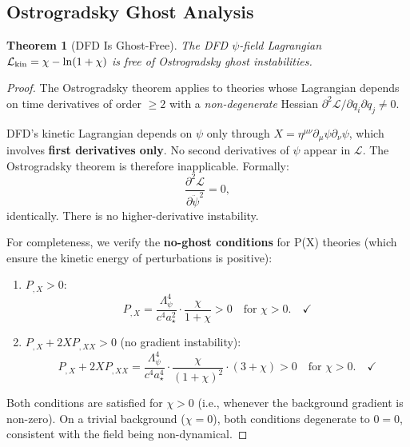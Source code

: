 \documentclass[11pt,a4paper]{article}
\newtheorem{theorem}{Theorem}
\begin{document}
\subsection{Ostrogradsky Ghost Analysis}

\begin{theorem}[DFD Is Ghost-Free]
\label{thm:ghost-free}
The DFD $\psi$-field Lagrangian $\mathcal{L}_{\rm kin} = \chi - \ln(1+\chi)$ is free of Ostrogradsky ghost instabilities.
\end{theorem}

\begin{proof}
The Ostrogradsky theorem applies to theories whose Lagrangian depends on time derivatives of order $\geq 2$ with a \emph{non-degenerate} Hessian $\partial^2\mathcal{L}/\partial\ddot{q}_i\partial\ddot{q}_j \neq 0$.

DFD's kinetic Lagrangian depends on $\psi$ only through $X = \eta^{\mu\nu}\partial_\mu\psi\partial_\nu\psi$, which involves \textbf{first derivatives only}. No second derivatives of $\psi$ appear in $\mathcal{L}$. The Ostrogradsky theorem is therefore inapplicable. Formally:
\begin{equation}
\frac{\partial^2\mathcal{L}}{\partial\ddot\psi^2} = 0,
\end{equation}
identically. There is no higher-derivative instability.

For completeness, we verify the \textbf{no-ghost conditions} for P(X) theories (which ensure the kinetic energy of perturbations is positive):
\begin{enumerate}
\item $P_{,X} > 0$:
\begin{equation}
P_{,X} = \frac{\Lambda_\psi^4}{c^4 a_\star^2}\cdot\frac{\chi}{1+\chi} > 0 \quad\text{for } \chi > 0. \quad\checkmark
\end{equation}

\item $P_{,X} + 2XP_{,XX} > 0$ (no gradient instability):
\begin{equation}
P_{,X} + 2XP_{,XX} = \frac{\Lambda_\psi^4}{c^4 a_\star^4}\cdot\frac{\chi}{(1+\chi)^2}\cdot(3 + \chi) > 0 \quad\text{for } \chi > 0. \quad\checkmark
\end{equation}
\end{enumerate}

Both conditions are satisfied for $\chi > 0$ (i.e., whenever the background gradient is non-zero). On a trivial background ($\chi = 0$), both conditions degenerate to $0 = 0$, consistent with the field being non-dynamical.
\end{proof}
\end{document}
